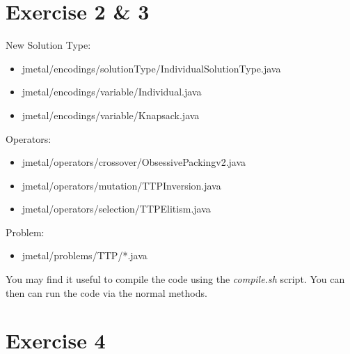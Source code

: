 \documentclass[a4paper,12pt]{article}
\begin{document}
\newpage
\section*{Exercise 2 \& 3}
New Solution Type:
\begin{itemize}
\item jmetal/encodings/solutionType/IndividualSolutionType.java
\item jmetal/encodings/variable/Individual.java
\item jmetal/encodings/variable/Knapsack.java
\end{itemize}
Operators:
\begin{itemize}
\item jmetal/operators/crossover/ObsessivePackingv2.java
\item jmetal/operators/mutation/TTPInversion.java
\item jmetal/operators/selection/TTPElitism.java
\end{itemize}
Problem:
\begin{itemize}
\item jmetal/problems/TTP/*.java
\end{itemize}
You may find it useful to compile the code using the \textit{compile.sh} script. You can then can run the code via the normal methods.\\

\section*{Exercise 4}
\end{document}
